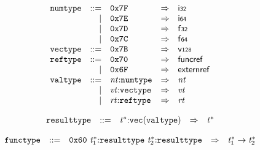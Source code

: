 $$
\begin{array}{@{}l@{}rrlll@{}l@{}}
& {\mathtt{numtype}} &::=& \mathtt{0x7F} &\Rightarrow& \mathsf{i{\scriptstyle32}} \\ &&|&
\mathtt{0x7E} &\Rightarrow& \mathsf{i{\scriptstyle64}} \\ &&|&
\mathtt{0x7D} &\Rightarrow& \mathsf{f{\scriptstyle32}} \\ &&|&
\mathtt{0x7C} &\Rightarrow& \mathsf{f{\scriptstyle64}} \\
& {\mathtt{vectype}} &::=& \mathtt{0x7B} &\Rightarrow& \mathsf{v{\scriptstyle128}} \\
& {\mathtt{reftype}} &::=& \mathtt{0x70} &\Rightarrow& \mathsf{funcref} \\ &&|&
\mathtt{0x6F} &\Rightarrow& \mathsf{externref} \\
& {\mathtt{valtype}} &::=& {\mathit{nt}}{:}{\mathtt{numtype}} &\Rightarrow& {\mathit{nt}} \\ &&|&
{\mathit{vt}}{:}{\mathtt{vectype}} &\Rightarrow& {\mathit{vt}} \\ &&|&
{\mathit{rt}}{:}{\mathtt{reftype}} &\Rightarrow& {\mathit{rt}} \\
\end{array}
$$

\vspace{1ex}

$$
\begin{array}{@{}l@{}rrlll@{}l@{}}
& {\mathtt{resulttype}} &::=& {{\mathit{t}}^\ast}{:}{\mathtt{vec}}({\mathtt{valtype}}) &\Rightarrow& {{\mathit{t}}^\ast} \\
\end{array}
$$

\vspace{1ex}

$$
\begin{array}{@{}l@{}rrlll@{}l@{}}
& {\mathtt{functype}} &::=& \mathtt{0x60}~{{\mathit{t}}_{{1}}^\ast}{:}{\mathtt{resulttype}}~{{\mathit{t}}_{{2}}^\ast}{:}{\mathtt{resulttype}} &\Rightarrow& {{\mathit{t}}_{{1}}^\ast} \rightarrow {{\mathit{t}}_{{2}}^\ast} \\
\end{array}
$$

\vspace{1ex}

